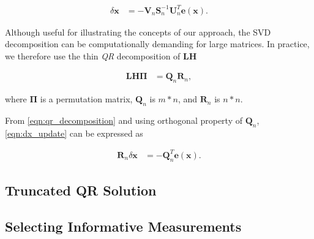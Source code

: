 \begin{equation}\label{eqn:dx_svd_solve}
  \begin{aligned}
  \delta\mathbf{x} &= -\mathbf{V}_n\mathbf{S}_n^{-1}\mathbf{U}_n^T
    \mathbf{e}(\mathbf{x}).
  \end{aligned}
\end{equation}

Although useful for illustrating the concepts of our approach, the SVD
decomposition can be computationally demanding for large matrices. In practice,
we therefore use the thin \emph{QR} decomposition of $\mathbf{L}\mathbf{H}$

\begin{equation}\label{eqn:qr_decomposition}
  \begin{aligned}
  \mathbf{L}\mathbf{H}\boldsymbol{\Pi} &= \mathbf{Q}_n\mathbf{R}_n,
  \end{aligned}
\end{equation}

where $\boldsymbol{\Pi}$ is a permutation matrix, $\mathbf{Q}_n$ is $m*n$, and
$\mathbf{R}_n$ is $n*n$.

From \eqref{eqn:qr_decomposition} and using orthogonal property of
$\mathbf{Q}_n$, \eqref{eqn:dx_update} can be expressed as

\begin{equation}\label{eqn:dx_qr_solve}
  \begin{aligned}
  \mathbf{R}_n\delta\mathbf{x} &= -\mathbf{Q}_n^T \mathbf{e}(\mathbf{x}).
  \end{aligned}
\end{equation}

\subsection{Truncated QR Solution}

\subsection{Selecting Informative Measurements}

